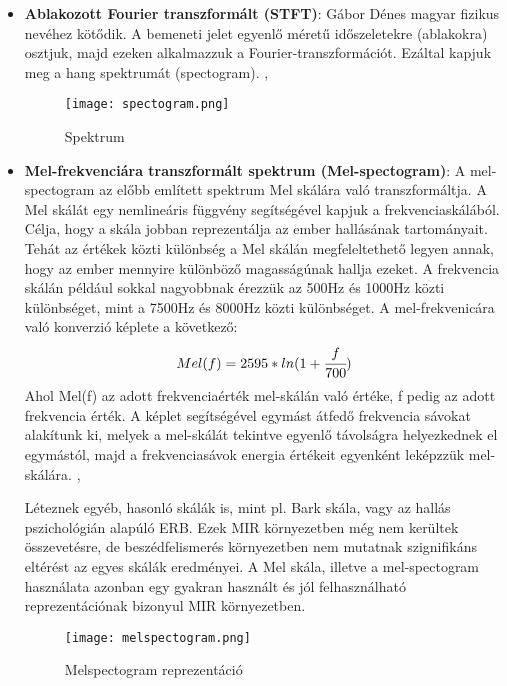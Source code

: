 \begin{itemize}
\item \textbf{Ablakozott Fourier transzformált (STFT)}: Gábor Dénes magyar fizikus nevéhez kötődik. A bemeneti jelet egyenlő méretű időszeletekre (ablakokra) osztjuk, majd ezeken alkalmazzuk a Fourier-transzformációt. Ezáltal kapjuk meg a hang spektrumát (spectogram).  \cite{melspec}, \cite{Choi2017}

\begin{figure}[H]
  \centering
  \texttt{[image: spectogram.png]}
  \caption{Spektrum \cite{librosa}}
\end{figure}

\item \textbf{Mel-frekvenciára transzformált spektrum (Mel-spectogram)}: A mel-spectogram az előbb említett spektrum Mel skálára való transzformáltja. A Mel skálát egy nemlineáris függvény segítségével kapjuk a frekvenciaskálából. Célja, hogy a skála jobban reprezentálja az ember hallásának tartományait. Tehát az értékek közti különbség a Mel skálán megfeleltethető legyen annak, hogy az ember mennyire különböző magasságúnak hallja ezeket. A frekvencia skálán például sokkal nagyobbnak érezzük az 500Hz és 1000Hz közti különbséget, mint a 7500Hz és 8000Hz közti különbséget. A mel-frekvenicára való konverzió képlete a következő: 
\begin{equation}
	Mel(f) = 2595*ln(1+\cfrac{f}{700})
\end{equation}
Ahol Mel(f) az adott frekvenciaérték mel-skálán való értéke, f pedig az adott frekvencia érték. A képlet segítségével egymást átfedő frekvencia sávokat alakítunk ki, melyek a mel-skálát tekintve egyenlő távolságra helyezkednek el egymástól, majd a frekvenciasávok energia értékeit egyenként leképzzük mel-skálára. \cite{melspec}, \cite{Choi2017}
 
Léteznek egyéb, hasonló skálák is, mint pl. Bark skála, vagy az hallás pszichológián alapúló ERB. Ezek MIR környezetben még nem kerültek összevetésre, de beszédfelismerés környezetben nem mutatnak szignifikáns eltérést az egyes skálák eredményei. A Mel skála, illetve a mel-spectogram használata azonban egy gyakran használt és jól felhasználható reprezentációnak bizonyul MIR környezetben. \cite{Choi2017}

\begin{figure}[H]
  \centering
  \texttt{[image: melspectogram.png]}
  \caption{Melspectogram reprezentáció \cite{librosa}}
\end{figure}


\end{itemize}
